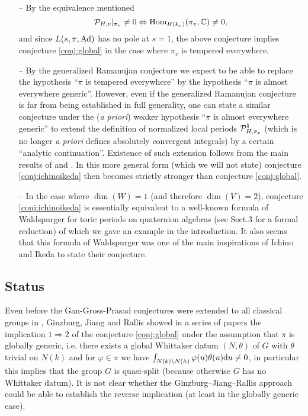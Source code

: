 \begin{remark}
\begin{itemize}
    \item[--] By the equivalence mentioned
    \[
        \mathcal{P}_{H, v}|_{\pi_v} \neq 0 \Leftrightarrow \mathrm{Hom}_{H(k_v)}(\pi_v, \mathbb{C}) \neq 0,
    \]
    and since $L(s, \pi, \mathrm{Ad})$ has no pole at $s = 1$, the above conjecture implies conjecture \ref{conj:global} in the case where $\pi_v$ is tempered everywhere.
    \item[--] By the generalized Ramanujan conjecture we expect to be able to replace the hypothesis ``$\pi$ is tempered everywhere'' by the hypothesis ``$\pi$ is almost everywhere generic''.
    However, even if the generalized Ramanujan conjecture is far from being established in full generality, one can state a similar conjecture under the (\emph{a priori}) weaker hypothesis ``$\pi$ is almost everywhere generic'' to extend the definition of normalized local periods $\mathcal{P}_{H, \pi_v}^\natural$ (which is no longer \emph{a priori} defines absolutely convergent integrals) by a certain ``analytic continuation''.
    Existence of such extension follows from the main results of \cite{beuzart2021comparison} and \cite{beuzart2017factorisations}.
    In this more general form (which we will not state) conjecture \ref{conj:ichinoikeda} then becomes strictly stronger than conjecture \ref{conj:global}.
    \item[--] In the case where $\dim(W) = 1$ (and therefore $\dim(V) = 2$), conjecture \ref{conj:ichinoikeda} is essentially equivalent to a well-known formula of Waldspurger \cite{waldspurger1985valeurs} for toric periods on quaternion algebras (see \cite{harris2014refined} Sect.3 for a formal reduction) of which we gave an example in the introduction.
    It also seems that this formula of Waldspurger was one of the main inspirations of Ichino and Ikeda to state their conjecture.
\end{itemize}
\end{remark}

\subsection{Status}



Even before the Gan-Gross-Prasad conjectures were extended to all classical groups in \cite{gan2011symplectic}, Ginzburg, Jiang and Rallis showed in a series of papers \cite{ginzburg488models,ginzburg2004nonvanishing,ginzburg2005nonvanishing} the implication $1 \Rightarrow 2$ of the conjecture \ref{conj:global} under the assumption that $\pi$ is globally generic, i.e. there exists a global Whittaker datum $(N, \theta)$ of $G$ with $\theta$ trivial on $N(k)$ and for $\varphi \in \pi$ we have $\int_{N(k) \backslash N(\mathbb{A})} \varphi(u) \theta(u) \mathrm{d} u \neq 0$, in particular this implies that the group $G$ is quasi-split (because otherwise $G$ has no Whittaker datum).
It is not clear whether the Ginzburg--Jiang--Rallis approach could be able to establish the reverse implication (at least in the globally generic case).

